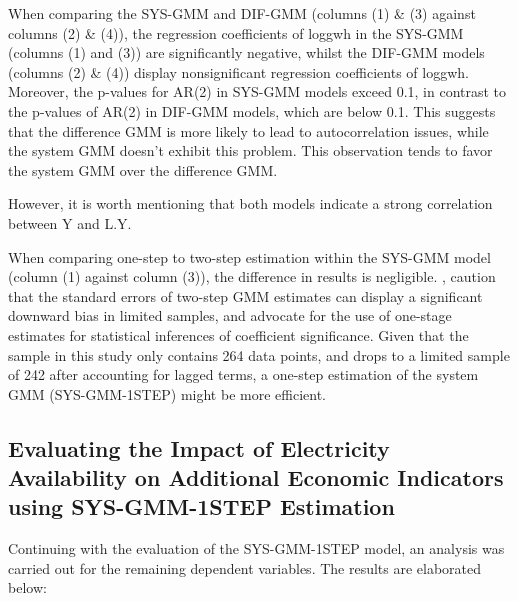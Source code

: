 \documentclass[12pt]{article}
\begin{document}
When comparing the SYS-GMM and DIF-GMM (columns (1) \& (3) against columns (2) \& (4)), the regression coefficients of loggwh in the SYS-GMM (columns (1) and (3)) are significantly negative, whilst the DIF-GMM models (columns (2) \& (4)) display nonsignificant regression coefficients of loggwh. Moreover, the p-values for AR(2) in SYS-GMM models exceed 0.1, in contrast to the p-values of AR(2) in DIF-GMM models, which are below 0.1. This suggests that the difference GMM is more likely to lead to autocorrelation issues, while the system GMM doesn't exhibit this problem. This observation tends to favor the system GMM over the difference GMM.

However, it is worth mentioning that both models indicate a strong correlation between Y and L.Y.

When comparing one-step to two-step estimation within the SYS-GMM model (column (1) against column (3)), the difference in results is negligible.  \cite{arellano1991some}, caution that the standard errors of two-step GMM estimates can display a significant downward bias in limited samples, and advocate for the use of one-stage estimates for statistical inferences of coefficient significance. Given that the sample in this study only contains 264 data points, and drops to a limited sample of 242 after accounting for lagged terms, a one-step estimation of the system GMM (SYS-GMM-1STEP) might be more efficient.

\subsection{Evaluating the Impact of Electricity Availability on Additional Economic Indicators using SYS-GMM-1STEP Estimation}

Continuing with the evaluation of the SYS-GMM-1STEP model, an analysis was carried out for the remaining dependent variables. The results are elaborated below:
\end{document}
